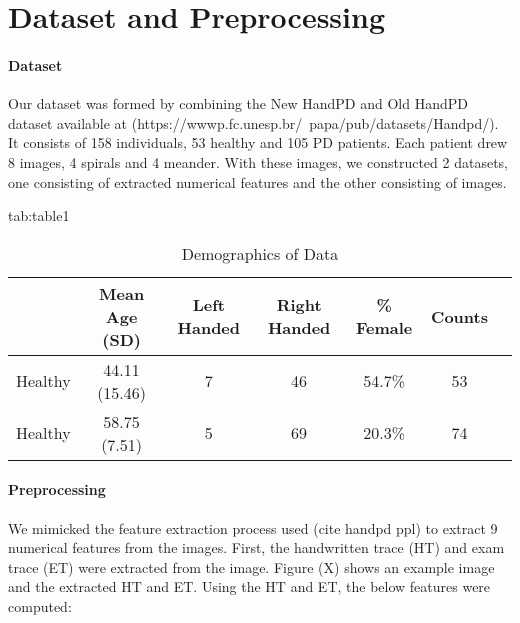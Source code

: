 \documentclass[pmlr,twocolumn,10pt]{jmlr} %
\begin{document}
\section{Dataset and Preprocessing}
\label{sec:Dataset+Preprocessing}

\paragraph{Dataset}
\label{sec:Dataset} Our dataset was formed by combining the New HandPD and Old HandPD dataset available at (https://wwwp.fc.unesp.br/~papa/pub/datasets/Handpd/). It consists of 158 individuals, 53 healthy and 105 PD patients. Each patient drew 8 images, 4 spirals and 4 meander. With these images, we constructed 2 datasets, one consisting of extracted numerical features and the other consisting of images.

\begin{table*}[hbtp]
\centering 
\floatconts
{tab:table1}
{\caption{Demographics of Data}} 
    {
        \begin{tabular}{lcccccc}
        \toprule
        \bfseries & \bfseries Mean Age (SD) & \bfseries Left Handed & \bfseries Right Handed & \bfseries \% Female & \bfseries Counts \\
        \midrule
        Healthy & 44.11 (15.46) & 7 & 46 & 54.7\% & 53 \\
        Healthy & 58.75 (7.51) & 5 & 69 & 20.3\% & 74 \\
        \bottomrule
        \end{tabular}
    }
\end{table*}

\paragraph{Preprocessing}
\label{sec:Preprocessing} 
We mimicked the feature extraction process used (cite handpd ppl) to extract 9 numerical features from the images. First, the handwritten trace (HT) and exam trace (ET) were extracted from the image. Figure (X) shows an example image and the extracted HT and ET.  Using the HT and ET, the below features were computed:
\end{document}
